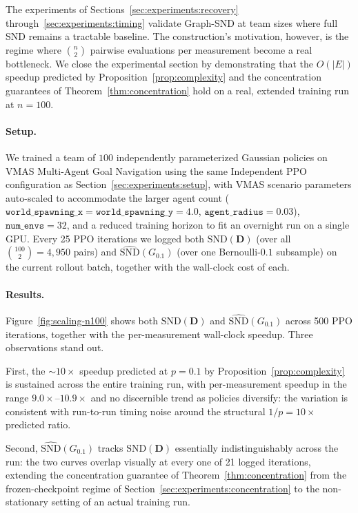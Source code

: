 \documentclass[11pt]{article}
\theoremstyle{plain}
\theoremstyle{definition}
\theoremstyle{remark}
\newcommand{\SND}{\ensuremath{\mathrm{SND}}}
\begin{document}
The experiments of Sections~\ref{sec:experiments:recovery}
through~\ref{sec:experiments:timing} validate Graph-SND at team sizes
where full $\SND$ remains a tractable baseline. The construction's
motivation, however, is the regime where $\binom{n}{2}$ pairwise
evaluations per measurement become a real bottleneck. We close the
experimental section by demonstrating that the $O(|E|)$ speedup
predicted by Proposition~\ref{prop:complexity} and the concentration
guarantees of Theorem~\ref{thm:concentration} hold on a real, extended
training run at $n = 100$.

\paragraph{Setup.} We trained a team of $100$ independently
parameterized Gaussian policies on VMAS Multi-Agent Goal Navigation
using the same Independent PPO configuration as
Section~\ref{sec:experiments:setup}, with VMAS scenario parameters
auto-scaled to accommodate the larger agent count
($\texttt{world\_spawning\_x} = \texttt{world\_spawning\_y} = 4.0$,
$\texttt{agent\_radius} = 0.03$), $\texttt{num\_envs} = 32$, and a
reduced training horizon to fit an overnight run on a single GPU.
Every 25 PPO iterations we logged both $\SND(\mathbf{D})$ (over all
$\binom{100}{2} = 4{,}950$ pairs) and
$\widehat{\SND}(G_{0.1})$ (over one Bernoulli-$0.1$ subsample) on the
current rollout batch, together with the wall-clock cost of each.

\paragraph{Results.} Figure~\ref{fig:scaling-n100} shows both
$\SND(\mathbf{D})$ and $\widehat{\SND}(G_{0.1})$ across 500 PPO
iterations, together with the per-measurement wall-clock speedup.
Three observations stand out.

First, the $\sim\!10\times$ speedup predicted at $p=0.1$ by
Proposition~\ref{prop:complexity} is sustained across the entire
training run, with per-measurement speedup in the range
$9.0\times$--$10.9\times$ and no discernible trend as policies
diversify: the variation is consistent with run-to-run timing
noise around the structural $1/p = 10\times$ predicted ratio.

Second, $\widehat{\SND}(G_{0.1})$ tracks $\SND(\mathbf{D})$
essentially indistinguishably across the run: the two curves overlap
visually at every one of 21 logged iterations, extending the
concentration guarantee of Theorem~\ref{thm:concentration} from the
frozen-checkpoint regime of
Section~\ref{sec:experiments:concentration} to the non-stationary
setting of an actual training run.
\end{document}
